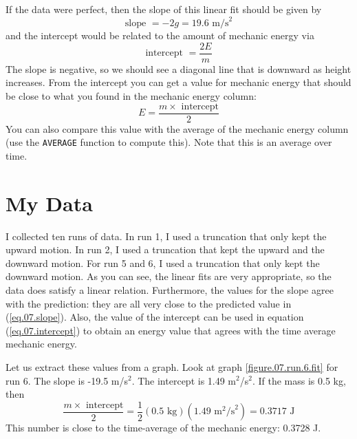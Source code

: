 If the data were perfect, then the slope of this linear fit should be given by
\begin{equation} \label{eq.07.slope}
    \text{slope } = -2g = 19.6 \text{ m/s}^{2}
\end{equation}
and the intercept would be related to the amount of mechanic energy via
\begin{equation}
    \text{intercept } = \frac{2 E}{m}
\end{equation}
The slope is negative, so we should see a diagonal line that is downward as height increases. From the intercept you can get a value for mechanic energy that should be close to what you found in the mechanic energy column:
\begin{equation} \label{eq.07.intercept}
    E = \frac{m \times \text{ intercept}}{2}
\end{equation}
You can also compare this value with the average of the mechanic energy column (use the \texttt{AVERAGE} function to compute this). Note that this is an average over time.
\section{My Data}
I collected ten runs of data. In run 1, I used a truncation that only kept the upward motion. In run 2, I used a truncation that kept the upward and the downward motion. For run 5 and 6, I used a truncation that only kept the downward motion. As you can see, the linear fits are very appropriate, so the data does satisfy a linear relation. Furthermore, the values for the slope agree with the prediction: they are all very close to the predicted value in (\ref{eq.07.slope}). Also, the value of the intercept can be used in equation (\ref{eq.07.intercept}) to obtain an energy value that agrees with the time average mechanic energy.

Let us extract these values from a graph. Look at graph \ref{figure.07.run.6.fit} for run 6. The slope is -19.5 m/s$^{2}$. The intercept is 1.49 m$^{2}$/s$^{2}$. If the mass is 0.5 kg, then
\begin{equation}
    \frac{m \times \text{ intercept}}{2} = \frac{1}{2} (0.5 \text{ kg}) (1.49 \text{ m}^{2}\text{/s}^{2}) = 0.3717 \text{ J}
\end{equation}
This number is close to the time-average of the mechanic energy: 0.3728 J.

